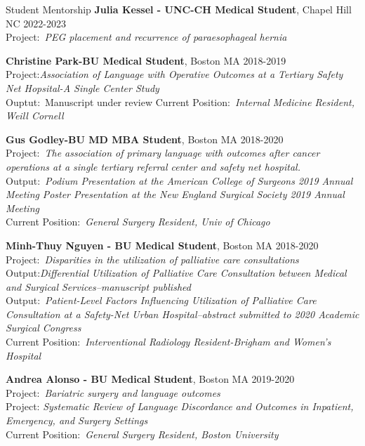 \documentclass{resume} %
\begin{document}

\begin{rSection}{Student Mentorship}
    {\bf Julia Kessel - UNC-CH Medical Student}{, Chapel Hill NC} \hfill {2022-2023}\\
   {Project:}~\textit{PEG placement and recurrence of paraesophageal hernia}
   
   {\bf Christine Park-BU Medical Student}{, Boston MA} \hfill {2018-2019}\\ 
   {Project:}\textit{Association of Language with Operative Outcomes at a Tertiary Safety Net Hopsital-A Single Center Study}\\
   {Ouptut:}~{Manuscript under review}
   {Current Position:}~\textit{Internal Medicine Resident, Weill Cornell}
   
   {\bf Gus Godley-BU MD MBA Student}{, Boston MA} \hfill {2018-2020}\\ 
   {Project:}~\textit{The association of primary language with outcomes after cancer operations at a single tertiary referral center and safety net hospital.}\\
   {Output:}~\textit{Podium Presentation at the American College of Surgeons 2019 Annual Meeting}
   \textit{Poster Presentation at the New England Surgical Society 2019 Annual Meeting}\\
   {Current Position:}~\textit{General Surgery Resident, Univ of Chicago}
   
   {\bf Minh-Thuy Nguyen - BU Medical Student}{, Boston MA} \hfill {2018-2020}\\
   { Project:}~\textit{Disparities in the utilization of palliative care consultations}\\
   {Output:}\textit{Differential Utilization of Palliative Care Consultation between Medical and Surgical Services--manuscript published}\\
   {Output:}~\textit{Patient-Level Factors Influencing Utilization of Palliative Care Consultation at a Safety-Net Urban Hospital--abstract submitted to 2020 Academic Surgical Congress}\\
   {Current Position:}~\textit{Interventional Radiology Resident-Brigham and Women's Hospital}
   
   {\bf Andrea Alonso - BU Medical Student}{, Boston MA} \hfill {2019-2020}\\
   {Project:}~\textit{Bariatric surgery and language outcomes}\\
   {Project:} \textit{Systematic Review of Language Discordance and Outcomes in Inpatient, Emergency, and Surgery Settings}\\
   {Current Position:}~\textit{General Surgery Resident, Boston University}
   \end{rSection}
\end{document}
